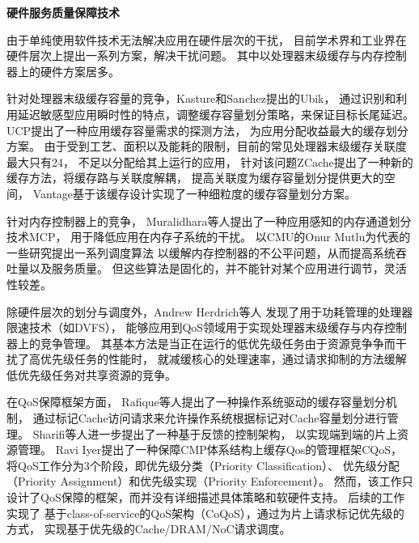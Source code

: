 \textbf{硬件服务质量保障技术}\quad

由于单纯使用软件技术无法解决应用在硬件层次的干扰，
目前学术界和工业界在硬件层次上提出一系列方案，解决干扰问题。
其中以处理器末级缓存与内存控制器上的硬件方案居多。

针对处理器末级缓存容量的竞争，Kasture和Sanchez提出的Ubik\cite{kasture_ubik:_2014}，
通过识别和利用延迟敏感型应用瞬时性的特点，调整缓存容量划分策略，来保证目标长尾延迟。
UCP\cite{qureshi_utility-based_2006}提出了一种应用缓存容量需求的探测方法，
为应用分配收益最大的缓存划分方案。
由于受到工艺、面积以及能耗的限制，目前的常见处理器末级缓存关联度最大只有24，
不足以分配给其上运行的应用，
针对该问题ZCache\cite{sanchez_zcache:_2010}提出了一种新的缓存方法，将缓存路与关联度解耦，
提高关联度为缓存容量划分提供更大的空间，
Vantage\cite{sanchez_vantage:_2011}基于该缓存设计实现了一种细粒度的缓存容量划分方案。


针对内存控制器上的竞争，
Muralidhara等人提出了一种应用感知的内存通道划分技术MCP\cite{muralidhara_reducing_2011}，
用于降低应用在内存子系统的干扰。
以CMU的Onur Mutlu为代表的一些研究提出一系列调度算法\cite{mutlu_stall-time_2007,
mutlu_parallelism-aware_2008, kim_atlas:_2010, kim_thread_2010}
以缓解内存控制器的不公平问题，从而提高系统吞吐量以及服务质量。
但这些算法是固化的，并不能针对某个应用进行调节，灵活性较差。

除硬件层次的划分与调度外，Andrew Herdrich等人\cite{herdrich_rate-based_2009}
发现了用于功耗管理的处理器限速技术（如DVFS），
能够应用到QoS领域用于实现处理器末级缓存与内存控制器上的竞争管理。
其基本方法是当正在运行的低优先级任务由于资源竞争争而干扰了高优先级任务的性能时，
就减缓核心的处理速率，通过请求抑制的方法缓解低优先级任务对共享资源的竞争。

在QoS保障框架方面，
Rafique等人提出了一种操作系统驱动的缓存容量划分机制\cite{Rafique:2006:ASO}，
通过标记Cache访问请求来允许操作系统根据标记对Cache容量划分进行管理。
Sharifi等人进一步提出了一种基于反馈的控制架构\cite{sharifi_mete:_2011}，
以实现端到端的片上资源管理。
Ravi Iyer提出了一种保障CMP体系结构上缓存Qos的管理框架CQoS\cite{iyer_cqos:_2004}，
将QoS工作分为3个阶段，即优先级分类（Priority Classification）、
优先级分配（Priority Assignment）和优先级实现（Priority Enforcement）。
然而，该工作只设计了QoS保障的框架，而并没有详细描述具体策略和软硬件支持。
后续的工作\cite{iyer_qos_2007, li_coqos:_2011, li_dynamic_2012}实现了
基于class-of-service的QoS架构（CoQoS），通过为片上请求标记优先级的方式，
实现基于优先级的Cache/DRAM/NoC请求调度。

\fi
